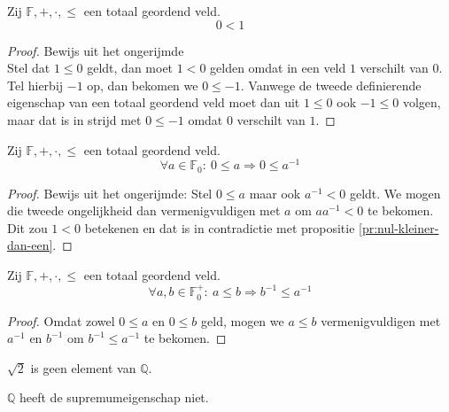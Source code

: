 \documentclass[main.tex]{subfiles}
\begin{document}
\begin{pr}
  \label{pr:nul-kleiner-dan-een}
  Zij $\mathbb{F},+,\cdot,\le$ een totaal geordend veld.
  \[ 0 < 1 \]

  \begin{proof}
    Bewijs uit het ongerijmde\\
    Stel dat $1 \le 0$ geldt, dan moet $1<0$ gelden omdat in een veld $1$ verschilt van $0$.
    Tel hierbij $-1$ op, dan bekomen we $0 \le -1$.
    Vanwege de tweede definierende eigenschap van een totaal geordend veld moet dan uit $1 \le 0$ ook $-1 \le 0$ volgen, maar dat is in strijd met $0 \le -1$ omdat $0$ verschilt van $1$.
  \end{proof}
\end{pr}

\begin{pr}
  \label{pr:geordend-veld-inverse-zelfde-teken}
  Zij $\mathbb{F},+,\cdot,\le$ een totaal geordend veld.
  \[ \forall a \in \mathbb{F}_{0}:\ 0 \le a \Rightarrow 0 \le a^{-1}\]

  \begin{proof}
    Bewijs uit het ongerijmde:
    Stel $0 \le a$ maar ook $a^{-1} < 0$ geldt.
    We mogen die tweede ongelijkheid dan vermenigvuldigen met $a$ om $aa^{-1}< 0$ te bekomen.
    Dit zou $1<0$ betekenen en dat is in contradictie met propositie \ref{pr:nul-kleiner-dan-een}.
  \end{proof}
\end{pr}

\begin{pr}
  \label{pr:geordend-veld-inverse-ongelijkheid-rekenregel}
  Zij $\mathbb{F},+,\cdot,\le$ een totaal geordend veld.
  \[ \forall a,b \in \mathbb{F}_{0}^{+}:\  a \le b \Rightarrow b^{-1} \le a^{-1}\]

  \begin{proof}
    Omdat zowel $0 \le a$ en $0 \le b$ geld, mogen we $a\le b$ vermenigvuldigen met $a^{-1}$ en $b^{-1}$ om $b^{-1} \le a^{-1}$ te bekomen.
  \end{proof}
\end{pr}

\begin{st}
  $\sqrt{2}$ is geen element van $\mathbb{Q}$.
\end{st}

\begin{st}
  $\mathbb{Q}$ heeft de supremumeigenschap niet.
\end{st}
\end{document}
